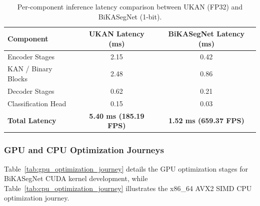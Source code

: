 \documentclass[a4paper]{report}
\begin{document}
\begin{table}[h!]
\centering
\small
\begin{tabular}{lcc}
\toprule
\textbf{Component} & \textbf{UKAN Latency (ms)} & \textbf{BiKASegNet Latency (ms)} \\
\midrule
Encoder Stages       & 2.15 & 0.42 \\
KAN / Binary Blocks  & 2.48 & 0.86 \\
Decoder Stages       & 0.62 & 0.21 \\
Classification Head  & 0.15 & 0.03 \\
\midrule
\textbf{Total Latency} & \textbf{5.40 ms (185.19 FPS)} & \textbf{1.52 ms (659.37 FPS)} \\
\bottomrule
\end{tabular}
\caption{Per-component inference latency comparison between UKAN (FP32) and BiKASegNet (1-bit).}
\label{tab:latency_profile}
\end{table}

\subsubsection{GPU and CPU Optimization Journeys}
Table~\ref{tab:gpu_optimization_journey} details the GPU optimization stages for BiKASegNet CUDA kernel development, while Table~\ref{tab:cpu_optimization_journey} illustrates the x86\_64 AVX2 SIMD CPU optimization journey.

\begin{table}[h!]
\centering
\caption{BiKASegNet GPU CUDA kernel optimization progression across versions V1--V8.}
\label{tab:gpu_optimization_journey}
\end{table}
\end{document}
